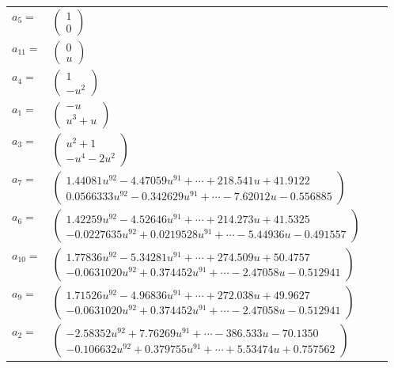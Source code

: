 \documentclass[1p]{elsarticle_modified}
\theoremstyle{definition}
\begin{document}
\begin{tabular}{m{7pt} m{180pt} m{7pt} m{180pt} }
\flushright $a_{5}=$&$\begin{pmatrix}1\\0\end{pmatrix}$ \\
\flushright $a_{11}=$&$\begin{pmatrix}0\\u\end{pmatrix}$ \\
\flushright $a_{4}=$&$\begin{pmatrix}1\\- u^2\end{pmatrix}$ \\
\flushright $a_{1}=$&$\begin{pmatrix}- u\\u^3+u\end{pmatrix}$ \\
\flushright $a_{3}=$&$\begin{pmatrix}u^2+1\\- u^4-2 u^2\end{pmatrix}$ \\
\flushright $a_{7}=$&$\begin{pmatrix}1.44081 u^{92}-4.47059 u^{91}+\cdots+218.541 u+41.9122\\0.0566333 u^{92}-0.342629 u^{91}+\cdots-7.62012 u-0.556885\end{pmatrix}$ \\
\flushright $a_{6}=$&$\begin{pmatrix}1.42259 u^{92}-4.52646 u^{91}+\cdots+214.273 u+41.5325\\-0.0227635 u^{92}+0.0219528 u^{91}+\cdots-5.44936 u-0.491557\end{pmatrix}$ \\
\flushright $a_{10}=$&$\begin{pmatrix}1.77836 u^{92}-5.34281 u^{91}+\cdots+274.509 u+50.4757\\-0.0631020 u^{92}+0.374452 u^{91}+\cdots-2.47058 u-0.512941\end{pmatrix}$ \\
\flushright $a_{9}=$&$\begin{pmatrix}1.71526 u^{92}-4.96836 u^{91}+\cdots+272.038 u+49.9627\\-0.0631020 u^{92}+0.374452 u^{91}+\cdots-2.47058 u-0.512941\end{pmatrix}$ \\
\flushright $a_{2}=$&$\begin{pmatrix}-2.58352 u^{92}+7.76269 u^{91}+\cdots-386.533 u-70.1350\\-0.106632 u^{92}+0.379755 u^{91}+\cdots+5.53474 u+0.757562\end{pmatrix}$ \\

\end{tabular}
\end{document}
